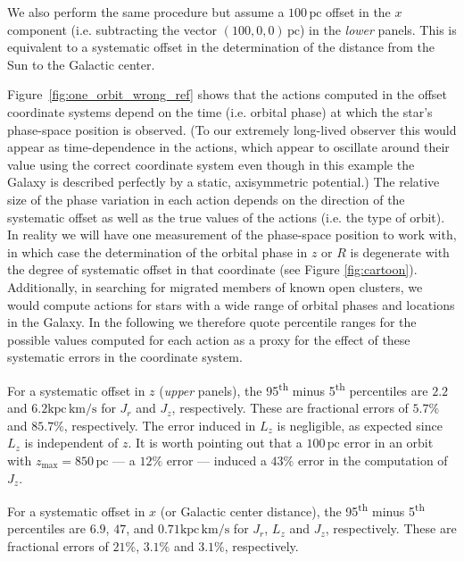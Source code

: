 \documentclass[twocolumn]{aastex62}
\newcommand{\pc}{\text{pc}}
\newcommand{\kms}{\text{km}/\text{s}}
\newcommand{\actunit}{\text{kpc}\,\kms}
\begin{document}
We also perform the same
    procedure but assume a $100\,\pc$ offset in the $x$ component (i.e.
    subtracting the vector $(100, 0, 0)\,\pc$) in the {\em lower} panels. This
    is equivalent to a systematic offset in the determination of the distance from the Sun to the Galactic center.

Figure~\ref{fig:one_orbit_wrong_ref} shows that the actions computed in the offset coordinate systems depend on the time (i.e. orbital phase) at which the star's phase-space position is observed. (To our extremely long-lived observer this would appear as time-dependence in the actions, which appear to oscillate around their value using the correct coordinate system even though in this example the Galaxy is described perfectly by a static, axisymmetric potential.) The relative size of the phase variation in each action depends on the direction of the systematic offset as well as the true values of the actions (i.e. the type of orbit). In reality we will have one measurement of the phase-space position to work with, in which case the determination of the orbital phase in $z$ or $R$ is degenerate with the degree of systematic offset in that coordinate (see Figure \ref{fig:cartoon}). Additionally, in searching for migrated members of known open clusters, we would compute actions for stars with a wide range of orbital phases and locations in the Galaxy. In the following we therefore quote percentile ranges for the possible values computed for each action as a proxy for the effect of these systematic errors in the coordinate system.

For a systematic offset in $z$ ({\em upper} panels), the 95\textsuperscript{th} minus
5\textsuperscript{th} percentiles are $2.2$ and $6.2 \actunit$ for $J_r$ and
$J_z$, respectively. These are fractional errors of $5.7\%$ and $85.7\%$,
respectively. The error induced in $L_z$ is negligible, as expected since
$L_z$ is independent of $z$. It is worth pointing out that a
$100\,\pc$ error in an orbit with $z_{\text{max}}=850\,\pc$ --- a $12\%$ error
--- induced a $43\%$ error in the computation of $J_z$.

For a systematic offset in $x$ (or Galactic center distance), the
95\textsuperscript{th} minus 5\textsuperscript{th} percentiles are $6.9$, $47$,
and $0.71 \actunit$ for $J_r$, $L_z$ and $J_z$, respectively. These are
fractional errors of $21\%$, $3.1\%$ and $3.1\%$, respectively.
\end{document}
